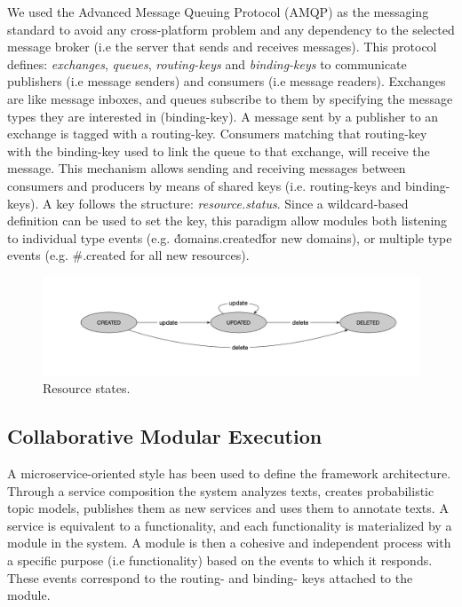 We used the Advanced Message Queuing Protocol (AMQP) as the messaging standard to avoid any cross-platform problem and any dependency to the selected message broker (i.e the server that sends and receives messages). This protocol defines: \textit{exchanges}, \textit{queues}, \textit{routing-keys} and \textit{binding-keys} to communicate publishers (i.e message senders) and consumers (i.e message readers). Exchanges are like message inboxes, and queues subscribe to them by specifying the message types they are interested in (binding-key). A message sent by a publisher to an exchange is tagged with a routing-key. Consumers matching that routing-key with the binding-key used to link the queue to that exchange, will receive the message. This mechanism allows sending and receiving messages between consumers and producers by means of shared keys (i.e. routing-keys and binding-keys). A key follows the structure: \textit{resource.status}. Since a wildcard-based definition can be used to set the key, this paradigm allow modules both listening to individual type events (e.g. \'domains.created\' for new domains), or multiple type events (e.g. \#.created for all new resources).


\begin{figure}
  \includegraphics[scale=0.3]{resource-states}
  \caption{Resource states.}
  \label{fig:librairy-states}
\end{figure}


\subsection{Collaborative Modular Execution}

A microservice-oriented style has been used to define the framework architecture. Through a service composition the system analyzes texts, creates probabilistic topic models, publishes them as new services and uses them to annotate texts. A service is equivalent to a functionality, and each functionality is materialized by a module in the system. A module is then a cohesive and independent process \cite{Dragoni2016} with a specific purpose (i.e functionality) based on the events to which it responds. These events correspond to the routing- and binding- keys attached to the module.

